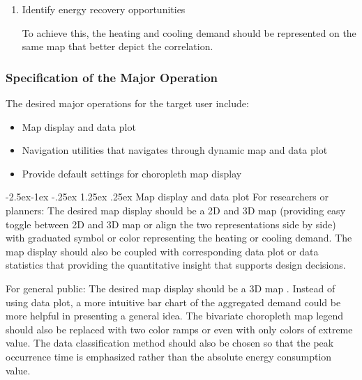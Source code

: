 \documentclass[hidelinks,12pt]{article}
\makeatletter
\renewcommand\paragraph{\@startsection{paragraph}{4}{\z@}%
            {-2.5ex\@plus -1ex \@minus -.25ex}%
            {1.25ex \@plus .25ex}%
            {\normalfont\normalsize\bfseries}}
\makeatother
\begin{document}
\begin{enumerate}[1).]
\item Identify energy recovery opportunities

  To achieve this, the heating and cooling demand should be
  represented on the same map that better depict the correlation.

\end{enumerate}

\subsubsection{Specification of the Major Operation}
The desired major operations for the target user include: 
\begin{itemize}
\item Map display and data plot
\item Navigation utilities that navigates through dynamic map and data
  plot
\item Provide default settings for choropleth map display
\end{itemize}

\paragraph{Map display and data plot}
For researchers or planners: The desired map display should be a 2D
and 3D map (providing easy toggle between 2D and 3D map or align the
two representations side by side) with graduated symbol or color
representing the heating or cooling demand. The map display should
also be coupled with corresponding data plot or data statistics that
providing the quantitative insight that supports design decisions.

For general public: The desired map display should be a 3D map
. Instead of using data plot, a more intuitive bar chart of the
aggregated demand could be more helpful in presenting a general
idea. The bivariate choropleth map legend should also be replaced with
two color ramps or even with only colors of extreme value. The data
classification method should also be chosen so that the peak
occurrence time is emphasized rather than the absolute energy
consumption value.
\end{document}
